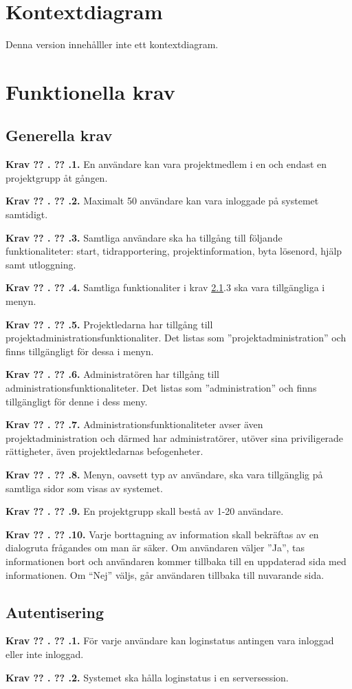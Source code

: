\documentclass[a4paper]{article}
\newcommand\getcurrentref[1]{%
 \ifnumequal{\value{#1}}{0}
  {??}
  {\the\value{#1}}%
}
\newcommand\requirement[2]{
	\numberedrow{Krav}{#1}{#2}
}
\newcommand\numberedrow[3]{
	\noindent
	\textbf{#1 \getcurrentref{section}.\getcurrentref{subsection}.#2.} #3
	
}
\begin{document}
\section{Kontextdiagram}
Denna version innehålller inte ett kontextdiagram.
\section{Funktionella krav}
\subsection{Generella krav}
\label{krav-funk-gen}

\requirement{1}{En användare kan vara projektmedlem i en och endast en projektgrupp åt gången.}
\requirement{2}{Maximalt 50 användare kan vara inloggade på systemet samtidigt.}
\requirement{3}{Samtliga användare ska ha tillgång till följande funktionaliteter: start, tidrapportering, projektinformation, byta lösenord, hjälp samt utloggning.}
\requirement{4}{Samtliga funktionaliter i krav \ref{krav-funk-gen}.3 ska vara tillgängliga i menyn.}
\requirement{5}{Projektledarna har tillgång till projektadministrationsfunktionaliter. Det listas som ''projektadministration'' och finns tillgängligt för dessa i menyn.}
\requirement{6}{Administratören har tillgång till administrationsfunktionaliteter. Det listas som ''administration'' och finns tillgängligt för denne i dess meny.}
\requirement{7}{Administrationsfunktionaliteter avser även projektadministration och därmed har administratörer, utöver sina priviligerade rättigheter, även projektledarnas befogenheter.}
\requirement{8}{Menyn, oavsett typ av användare, ska vara tillgänglig på samtliga sidor som visas av systemet.}
\requirement{9}{En projektgrupp skall bestå av 1-20 användare.}
\requirement{10}{Varje borttagning av information skall bekräftas av en dialogruta frågandes om man är säker. Om användaren väljer ''Ja'', tas informationen bort och användaren kommer tillbaka till en uppdaterad sida med informationen. Om ``Nej'' väljs, går användaren tillbaka till nuvarande sida.}
 
\subsection{Autentisering}
\label{krav-funk-aut}
\requirement{1}{För varje användare kan loginstatus antingen vara inloggad eller inte inloggad.}
\requirement{2}{Systemet ska hålla loginstatus i en serversession.}

\end{document}
